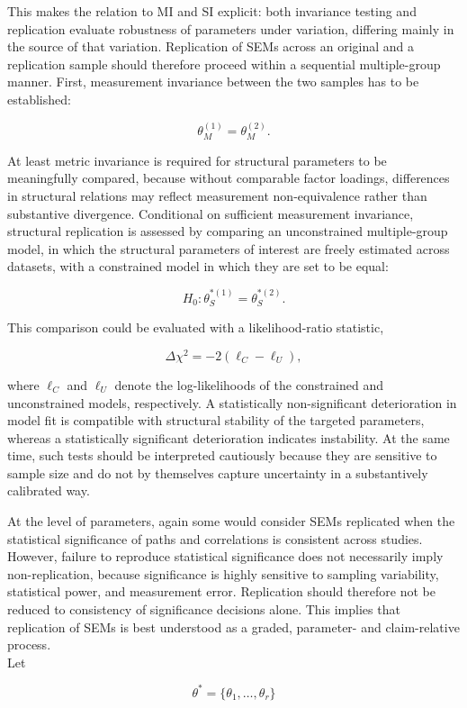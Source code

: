 \documentclass[
  12pt,
  letterpaper,
  man]{apa7}
\begin{document}
This makes the relation to MI and SI explicit: both invariance testing
and replication evaluate robustness of parameters under variation,
differing mainly in the source of that variation. Replication of SEMs
across an original and a replication sample should therefore proceed
within a sequential multiple-group manner. First, measurement invariance
between the two samples has to be established:

\[\theta_M^{(1)} = \theta_M^{(2)}. \]

At least metric invariance is required for structural parameters to be
meaningfully compared, because without comparable factor loadings,
differences in structural relations may reflect measurement
non-equivalence rather than substantive divergence. Conditional on
sufficient measurement invariance, structural replication is assessed by
comparing an unconstrained multiple-group model, in which the structural
parameters of interest are freely estimated across datasets, with a
constrained model in which they are set to be equal:

\[ H_0: \theta_S^{*(1)} = \theta_S^{*(2)}. \]

This comparison could be evaluated with a likelihood-ratio statistic,

\[ \Delta \chi^2 = -2(\ell_C - \ell_U), \]

where \(\ell_C\) and \(\ell_U\) denote the log-likelihoods of the
constrained and unconstrained models, respectively. A statistically
non-significant deterioration in model fit is compatible with structural
stability of the targeted parameters, whereas a statistically
significant deterioration indicates instability. At the same time, such
tests should be interpreted cautiously because they are sensitive to
sample size and do not by themselves capture uncertainty in a
substantively calibrated way.

At the level of parameters, again some would consider SEMs replicated
when the statistical significance of paths and correlations is
consistent across studies. However, failure to reproduce statistical
significance does not necessarily imply non-replication, because
significance is highly sensitive to sampling variability, statistical
power, and measurement error. Replication should therefore not be
reduced to consistency of significance decisions alone. This implies
that replication of SEMs is best understood as a graded, parameter- and
claim-relative process.\\
Let

\[ \theta^* = \{\theta_1, \dots, \theta_r\} \]
\end{document}
